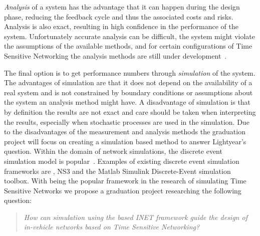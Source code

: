 \textit{Analysis} of a system has the advantage that it can happen during the design phase, reducing the feedback cycle and thus the associated costs and risks. Analysis is also exact, resulting in high confidence in the performance of the system. Unfortunately accurate analysis can be difficult, the system might violate the assumptions of the available methods, and for certain configurations of Time Sensitive Networking the analysis methods are still under development~\cite{ashjaei2021time}. 

The final option is to get performance numbers through \textit{simulation} of the system. The advantages of simulation are that it does not depend on the availability of a real system and is not constrained by boundary conditions or assumptions about the system an analysis method might have. A disadvantage of simulation is that by definition the results are not exact and care should be taken when interpreting the results, especially when stochastic processes are used in the simulation. Due to the disadvantages of the measurement and analysis methods the graduation project will focus on creating a simulation based method to answer Lightyear's question. Within the domain of network simulations, the discrete event simulation model is popular~\cite{ashjaei2021time}. Examples of existing discrete event simulation frameworks are \omnet, NS3 and the Matlab Simulink Discrete-Event simulation toolbox. With \omnet being the popular framework in the research of simulating Time Sensitive Networks we propose a graduation project researching the following question:

\begin{quote}
\emph{How can simulation using the \omnet based INET framework guide the design of in-vehicle networks based on Time Sensitive Networking?}
\end{quote}

